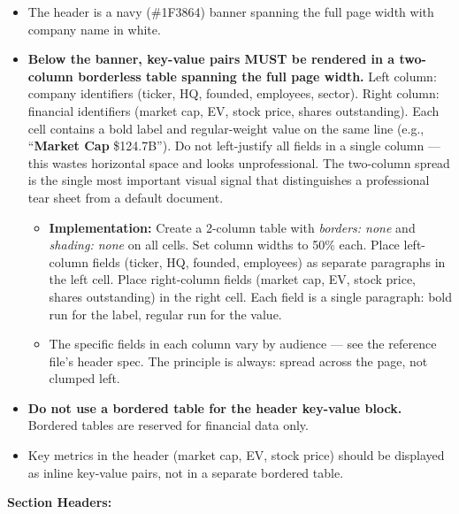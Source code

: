 \documentclass[11pt]{article}
\begin{document}
\begin{itemize}[leftmargin=*,itemsep=2pt,topsep=2pt]
\item {} The header is a navy (\#1F3864) banner spanning the full page width with company name in white.
\item {} \textbf{Below the banner, key-value pairs MUST be rendered in a two-column borderless table spanning the full page width.} Left column: company identifiers (ticker, HQ, founded, employees, sector). Right column: financial identifiers (market cap, EV, stock price, shares outstanding). Each cell contains a bold label and regular-weight value on the same line (e.g., ``\textbf{Market Cap} \$124.7B''). Do not left-justify all fields in a single column — this wastes horizontal space and looks unprofessional. The two-column spread is the single most important visual signal that distinguishes a professional tear sheet from a default document.
\begin{itemize}[leftmargin=*,itemsep=2pt,topsep=2pt]
\item {} \textbf{Implementation:} Create a 2-column table with \emph{borders: none} and \emph{shading: none} on all cells. Set column widths to 50\% each. Place left-column fields (ticker, HQ, founded, employees) as separate paragraphs in the left cell. Place right-column fields (market cap, EV, stock price, shares outstanding) in the right cell. Each field is a single paragraph: bold run for the label, regular run for the value.
\item {} The specific fields in each column vary by audience — see the reference file's header spec. The principle is always: spread across the page, not clumped left.
\end{itemize}
\item {} \textbf{Do not use a bordered table for the header key-value block.} Bordered tables are reserved for financial data only.
\item {} Key metrics in the header (market cap, EV, stock price) should be displayed as inline key-value pairs, not in a separate bordered table.
\end{itemize}

\textbf{Section Headers:}
\end{document}
